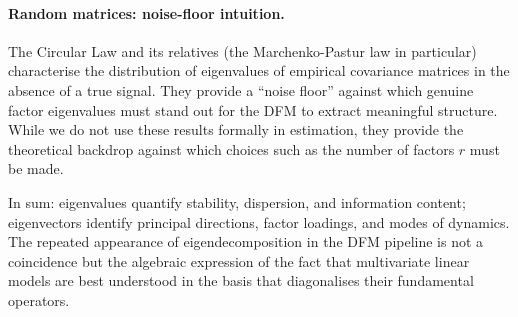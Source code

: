 \documentclass[11pt, a4paper, oneside]{article}
\begin{document}
\paragraph{Random matrices: noise-floor intuition.}
The Circular Law and its relatives (the Marchenko-Pastur law in
particular) characterise the distribution of eigenvalues of empirical
covariance matrices in the absence of a true signal. They provide a
``noise floor'' against which genuine factor eigenvalues must stand
out for the DFM to extract meaningful structure. While we do not use
these results formally in estimation, they provide the theoretical
backdrop against which choices such as the number of factors $r$
must be made.

In sum: eigenvalues quantify stability, dispersion, and information
content; eigenvectors identify principal directions, factor
loadings, and modes of dynamics. The repeated appearance of
eigendecomposition in the DFM pipeline is not a coincidence but the
algebraic expression of the fact that multivariate linear models are
best understood in the basis that diagonalises their fundamental
operators.
\end{document}
